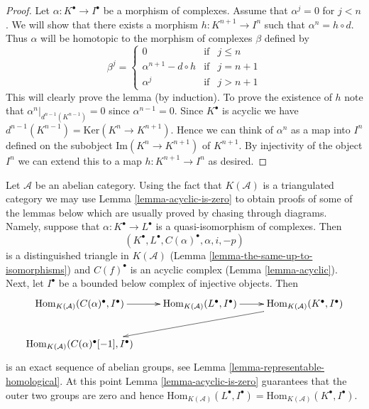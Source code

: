 \begin{proof}
Let $\alpha : K^\bullet \to I^\bullet$ be a morphism of
complexes. Assume that $\alpha^j = 0$ for $j < n$.
We will show that there exists a morphism $h : K^{n + 1} \to I^n$
such that $\alpha^n = h \circ d$. Thus $\alpha$ will be homotopic
to the morphism of complexes $\beta$ defined by
$$
\beta^j =
\left\{
\begin{matrix}
0 & \text{if} & j \leq n \\
\alpha^{n + 1} - d \circ h & \text{if} & j = n + 1 \\
\alpha^j & \text{if} & j > n + 1
\end{matrix}
\right.
$$
This will clearly prove the lemma (by induction).
To prove the existence of $h$ note that
$\alpha^n|_{d^{n - 1}(K^{n - 1})} = 0$ since
$\alpha^{n - 1} = 0$. Since $K^\bullet$ is acyclic we
have $d^{n - 1}(K^{n - 1}) = \text{Ker}(K^n \to K^{n + 1})$.
Hence we can think of $\alpha^n$ as a map into $I^n$ defined
on the subobject $\text{Im}(K^n \to K^{n + 1})$ of $K^{n + 1}$.
By injectivity of the object $I^n$ we can extend this to
a map $h : K^{n + 1} \to I^n$ as desired.
\end{proof}

\begin{remark}
\label{remark-easier-proofs}
Let $\mathcal{A}$ be an abelian category.
Using the fact that $K(\mathcal{A})$ is a triangulated category we
may use
Lemma \ref{lemma-acyclic-is-zero}
to obtain proofs of some of the lemmas below which are usually proved by
chasing through diagrams.
Namely, suppose that $\alpha : K^\bullet \to L^\bullet$ is a quasi-isomorphism
of complexes. Then
$$
(K^\bullet, L^\bullet, C(\alpha)^\bullet, \alpha, i, -p)
$$
is a distinguished triangle in $K(\mathcal{A})$
(Lemma \ref{lemma-the-same-up-to-isomorphisms})
and $C(f)^\bullet$ is an acyclic complex
(Lemma \ref{lemma-acyclic}).
Next, let $I^\bullet$ be a bounded below complex of injective objects. Then
$$
\xymatrix{
\text{Hom}_{K(\mathcal{A})}(C(\alpha)^\bullet, I^\bullet) \ar[r] &
\text{Hom}_{K(\mathcal{A})}(L^\bullet, I^\bullet) \ar[r] &
\text{Hom}_{K(\mathcal{A})}(K^\bullet, I^\bullet) \ar[lld] \\
\text{Hom}_{K(\mathcal{A})}(C(\alpha)^\bullet[-1], I^\bullet)
}
$$
is an exact sequence of abelian groups, see
Lemma \ref{lemma-representable-homological}.
At this point
Lemma \ref{lemma-acyclic-is-zero}
guarantees that the outer two groups are zero and hence
$\text{Hom}_{K(\mathcal{A})}(L^\bullet, I^\bullet) =
\text{Hom}_{K(\mathcal{A})}(K^\bullet, I^\bullet)$.
\end{remark}

